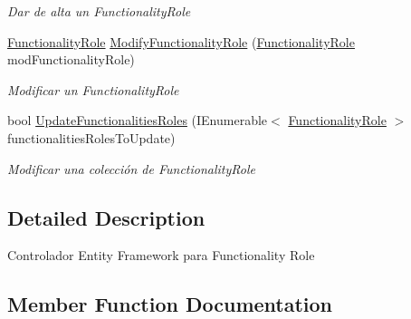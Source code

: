 \begin{DoxyCompactItemize}
\begin{DoxyCompactList}\small\item\em Dar de alta un Functionality\+Role \end{DoxyCompactList}\item 
\hyperlink{class_h_k_supply_1_1_models_1_1_functionality_role}{Functionality\+Role} \hyperlink{class_h_k_supply_1_1_services_1_1_implementations_1_1_e_f_functionality_role_a69bbb7f8593ea4e0e70ce96625cf80e4}{Modify\+Functionality\+Role} (\hyperlink{class_h_k_supply_1_1_models_1_1_functionality_role}{Functionality\+Role} mod\+Functionality\+Role)
\begin{DoxyCompactList}\small\item\em Modificar un Functionality\+Role \end{DoxyCompactList}\item 
bool \hyperlink{class_h_k_supply_1_1_services_1_1_implementations_1_1_e_f_functionality_role_a298798bba5c1a7e5a1db34803e3e4707}{Update\+Functionalities\+Roles} (I\+Enumerable$<$ \hyperlink{class_h_k_supply_1_1_models_1_1_functionality_role}{Functionality\+Role} $>$ functionalities\+Roles\+To\+Update)
\begin{DoxyCompactList}\small\item\em Modificar una colección de Functionality\+Role \end{DoxyCompactList}\end{DoxyCompactItemize}


\subsection{Detailed Description}
Controlador Entity Framework para Functionality Role 



\subsection{Member Function Documentation}
\mbox{\label{class_h_k_supply_1_1_services_1_1_implementations_1_1_e_f_functionality_role_a6c0fd4aad39788ef597f701f47032a85}} 
